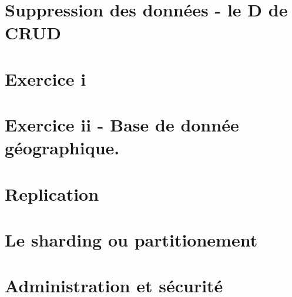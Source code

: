 \documentclass{article}
\begin{document}
    
    
\newpage
    
\section{Suppression des données - le D de CRUD}
    
    
    
\section{Exercice i}

    
    
\newpage

    

    
    
\section{Exercice ii - Base de donnée géographique.}
    
    
    
\section{Replication}

    
    
    
\section{Le sharding ou partitionement}

    

\section{Administration et sécurité}

    
    
\newpage

\section*{}
    
    
    
\newpage

     
    
     
    
\end{document}
